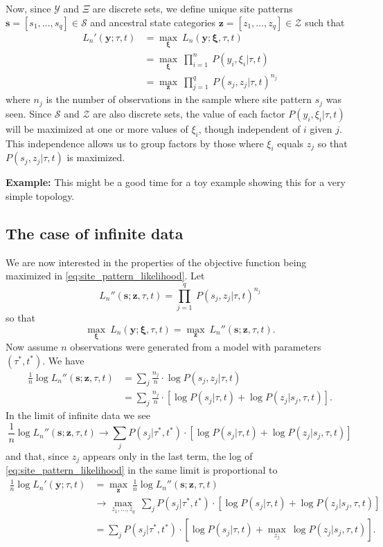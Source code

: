 \documentclass[a4paper]{article}
\begin{document}
Now, since $\mathcal{Y}$ and $\Xi$ are discrete sets, we define unique site patterns $\mathbf{s}=[s_1,\ldots,s_q]\in\mathcal{S}$ and ancestral state categories $\mathbf{z}=[z_1,\ldots,z_q]\in\mathcal{Z}$ such that
\begin{align}
L_n'(\mathbf{y};\tau, t) &= \max_{\boldsymbol\xi} \ L_n(\mathbf{y};\boldsymbol\xi, \tau, t) \\
    &= \max_{\boldsymbol\xi} \ \prod_{i=1}^{n} \ P(y_i, \xi_i | \tau, t) \\
    &= \max_{\mathbf{z}} \ \prod_{j=1}^{q} \ P(s_j, z_j | \tau, t)^{n_j} \label{eq:site_pattern_likelihood}
\end{align}
where $n_j$ is the number of observations in the sample where site pattern $s_j$ was seen.
Since $\mathcal{S}$ and $\mathcal{Z}$ are also discrete sets, the value of each factor $P(y_i, \xi_i | \tau, t)$ will be maximized at one or more values of $\xi_i$, though independent of $i$ given $j$.
This independence allows us to group factors by those where $\xi_i$ equals $z_j$ so that $P(s_j, z_j | \tau, t)$ is maximized.

\textbf{Example:} This might be a good time for a toy example showing this for a very simple topology.

\subsection{The case of infinite data}

We are now interested in the properties of the objective function being maximized in \eqref{eq:site_pattern_likelihood}.
Let
$$
L_n''(\mathbf{s};\mathbf{z},\tau,t) = \prod_{j=1}^q \ P(s_j, z_j | \tau, t)^{n_j}
$$
so that
$$
\max_{\boldsymbol\xi} \ L_n(\mathbf{y};\boldsymbol\xi, \tau, t) = \max_{\mathbf{z}} \ L_n''(\mathbf{s};\mathbf{z},\tau,t).
$$
Now assume $n$ observations were generated from a model with parameters $(\tau^*, t^*)$.
We have
\begin{align}
\frac{1}{n} \log L_n''(\mathbf{s};\mathbf{z},\tau,t) &= \sum_{j} \frac{n_j}{n}\cdot \log P(s_j, z_j | \tau, t) \\
  &= \sum_{j} \frac{n_j}{n}\cdot [\log P(s_j | \tau, t) + \log P(z_j | s_j, \tau, t)].
\end{align}
In the limit of infinite data we see
$$
\frac{1}{n} \log L_n''(\mathbf{s};\mathbf{z},\tau,t) \rightarrow \sum_{j} P(s_j | \tau^*, t^*) \cdot [\log P(s_j | \tau, t) + \log P(z_j | s_j, \tau, t)]
$$
and that, since $z_j$ appears only in the last term, the log of \eqref{eq:site_pattern_likelihood} in the same limit is proportional to
\begin{align}
\frac{1}{n} \log L_n'(\mathbf{y};\tau, t) &= \max_{\mathbf{z}} \ \frac{1}{n} \log L_n''(\mathbf{s};\mathbf{z},\tau,t) \\
    &\rightarrow \max_{z_1, \ldots, z_q} \ \sum_{j} P(s_j | \tau^*, t^*) \cdot [\log P(s_j | \tau, t) + \log P(z_j | s_j, \tau, t)] \\
    &= \sum_{j} P(s_j | \tau^*, t^*) \cdot [\log P(s_j | \tau, t) + \max_{z_j} \ \log P(z_j | s_j, \tau, t)]. \label{eq:site_pattern_profile_likelihood_mean}
\end{align}
\end{document}
